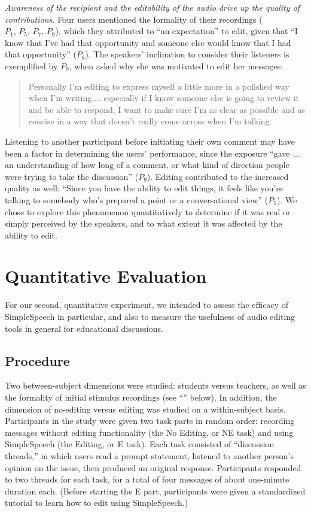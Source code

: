 \emph{Awareness of the recipient and the editability of the audio drive up the quality of contributions.}
Four users mentioned the formality of their recordings ($P_1,\,P_5,\,P_7,\,P_9$), which they attributed to ``an expectation'' to edit, given that ``I know that I've had that opportunity and someone else would know that I had that opportunity'' ($P_8$).
The speakers' inclination to consider their listeners is exemplified by $P_9$, when asked why she was motivated to edit her messages:
\begin{quote}
	Personally I'm editing to express myself a little more in a polished way when I'm writing.... especially if I know someone else is going to review it and be able to respond, I want to make sure I'm as clear as possible and as concise in a way that doesn't really come across when I'm talking.
\end{quote}
Listening to another participant before initiating their own comment may have been a factor in determining the users' performance, since the exposure ``gave ... an understanding of how long of a comment, or what kind of direction people were trying to take the discussion'' ($P_9$). 
Editing contributed to the increased quality as well: ``Since you have the ability to edit things, it feels like you're talking to somebody who's prepared a point or a conversational view'' ($P_5$). 
We chose to explore this phenomenon quantitatively to determine if it was real or simply perceived by the speakers, and to what extent it was affected by the ability to edit.

\section{Quantitative Evaluation}
For our second, quantitative experiment, we intended to assess the efficacy of SimpleSpeech in particular, and also to measure the usefulness of audio editing tools in general for educational discussions.

\subsection{Procedure}
Two between-subject dimensions were studied: students versus teachers, as well as the formality of initial stimulus recordings (see ``'' below).
In addition, the dimension of no-editing versus editing was studied on a within-subject basis.
Participants in the study were given two task parts in random order: recording messages without editing functionality (the No Editing, or NE task) and using SimpleSpeech (the Editing, or E task). 
Each task consisted of ``discussion threads,'' in which users read a prompt statement, listened to another person's opinion on the issue, then produced an original response.
Participants responded to two threads for each task, for a total of four messages of about one-minute duration each.
(Before starting the E part, participants were given a standardized tutorial to learn how to edit using SimpleSpeech.)

